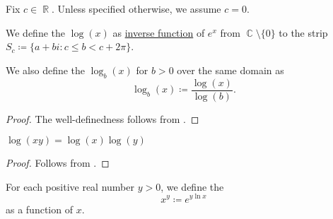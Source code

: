 \begin{definition}\label{def:logarithm}
  Fix \( c \in \BbbR \). Unless specified otherwise, we assume \( c = 0 \).

  We define the  \( \log(x) \) as \hyperref[def:set_valued_map/inverse]{inverse function} of \( e^x \) from \( \BbbC \setminus \{ 0 \} \) to the strip \( S_c \coloneqq \{ a + bi \colon c \leq b < c + 2\pi \} \).

  We also define the  \( \log_b(x) \) for \( b > 0 \) over the same domain as
  \begin{equation*}
    \log_b(x) \coloneqq \frac {\log(x)} {\log(b)}.
  \end{equation*}
\end{definition}
\begin{proof}
  The well-definedness follows from .
\end{proof}

\begin{proposition}\label{thm:def:logarithm}
  \hfill
  \begin{thmenum}
     \( \log(xy) = \log(x) \log(y) \)
  \end{thmenum}
\end{proposition}
\begin{proof}
   Follows from .
\end{proof}

\begin{definition}\label{def:power_function}
  For each positive real number \( y > 0 \), we define the 
  \begin{equation*}
    x^y \coloneqq e^{y \ln x}
  \end{equation*}
  as a function of \( x \).
\end{definition}

